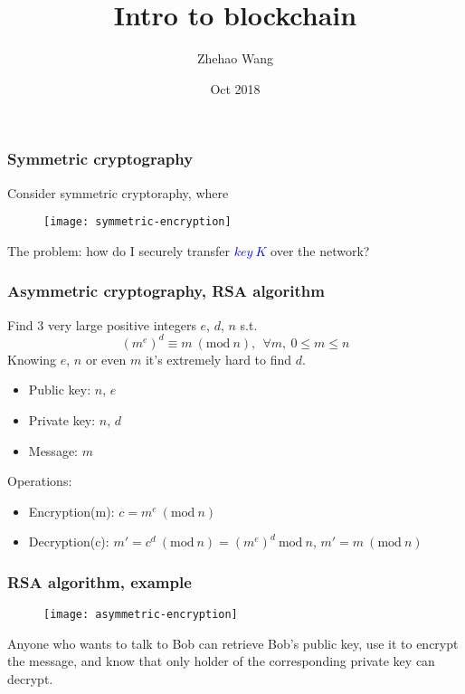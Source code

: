 \documentclass{beamer}
\begin{document}
\title{Intro to blockchain}
\author{Zhehao Wang}
\date{Oct 2018}

\frame{\titlepage}

\begin{frame}
\frametitle{Symmetric cryptography}

Consider symmetric cryptoraphy, where

\begin{figure}
  \centering
  \texttt{[image: symmetric-encryption]}
\end{figure}

The problem: how do I securely transfer \textcolor{blue}{$key~K$} over the network?

\end{frame}

\begin{frame}
\frametitle{Asymmetric cryptography, RSA algorithm}

Find 3 very large positive integers $e$, $d$, $n$ s.t.
$$
(m^e)^d \equiv m ~ (\text{mod} ~ n), ~ ~ \forall m,~ 0 \leq m \le n
$$
Knowing $e$, $n$ or even $m$ it's extremely hard to find $d$.

\begin{itemize}
    \item Public key: $n$, $e$
    \item Private key: $n$, $d$
    \item Message: $m$
\end{itemize}

Operations:
\begin{itemize}
    \item Encryption(m): $c = m^e ~ (\text{mod} ~ n)$
    \item Decryption(c): $m' = c^d ~ (\text{mod} ~ n) = (m^e)^d ~ \text{mod} ~ n$, $m' = m ~ (\text{mod} ~ n)$
\end{itemize}

\end{frame}

\begin{frame}
\frametitle{RSA algorithm, example}

\begin{figure}
  \centering
  \texttt{[image: asymmetric-encryption]}
\end{figure}

Anyone who wants to talk to Bob can retrieve Bob's public key, use it to encrypt the message, and know that only holder of the corresponding private key can decrypt.

\end{frame}
\end{document}
